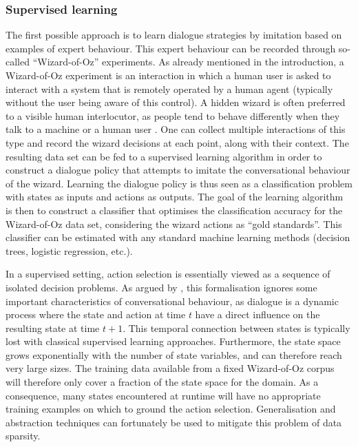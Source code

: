\subsubsection*{Supervised learning}

The first possible approach is to learn dialogue strategies by imitation based on examples of expert behaviour.  This expert behaviour can be recorded through so-called ``Wizard-of-Oz'' experiments.  As already mentioned in the introduction, a Wizard-of-Oz experiment is an interaction in which a human user is asked to interact with a system that is remotely operated by a human agent (typically without the user being aware of this control).  A hidden wizard is often preferred to a visible human interlocutor, as people tend to behave differently when they talk to a machine or a human user \citep{JonnsonD88}.  One can collect multiple interactions of this type and record the wizard decisions at each point, along with their context.   The resulting data set can be fed to a supervised learning algorithm in order to construct a dialogue policy that attempts to imitate the conversational behaviour of the wizard.  Learning the dialogue policy is thus seen as a classification problem with states as inputs and actions as outputs. The goal of the learning algorithm is then to construct a classifier  that optimises the classification accuracy for the Wizard-of-Oz data set, considering the wizard actions as ``gold standards''.  This classifier can be estimated with any standard machine learning methods (decision trees, logistic regression, etc.).
 
In a supervised setting, action selection is essentially viewed as a sequence of isolated decision problems.  As argued by \cite{817450}, this formalisation ignores some important characteristics of conversational behaviour, as dialogue is a dynamic process where the state and action at time $t$ have a direct influence on the resulting state at time $t+1$.  This temporal connection between states is typically lost with classical supervised learning approaches. Furthermore, the state space grows exponentially with the number of state variables, and can therefore reach very large sizes.  The training data available from a fixed Wizard-of-Oz corpus will therefore only cover a fraction of the state space for the domain.  As a consequence, many states encountered at runtime will have no appropriate training examples on which to ground the action selection.  Generalisation and abstraction techniques can fortunately be used to mitigate this problem of data sparsity.

